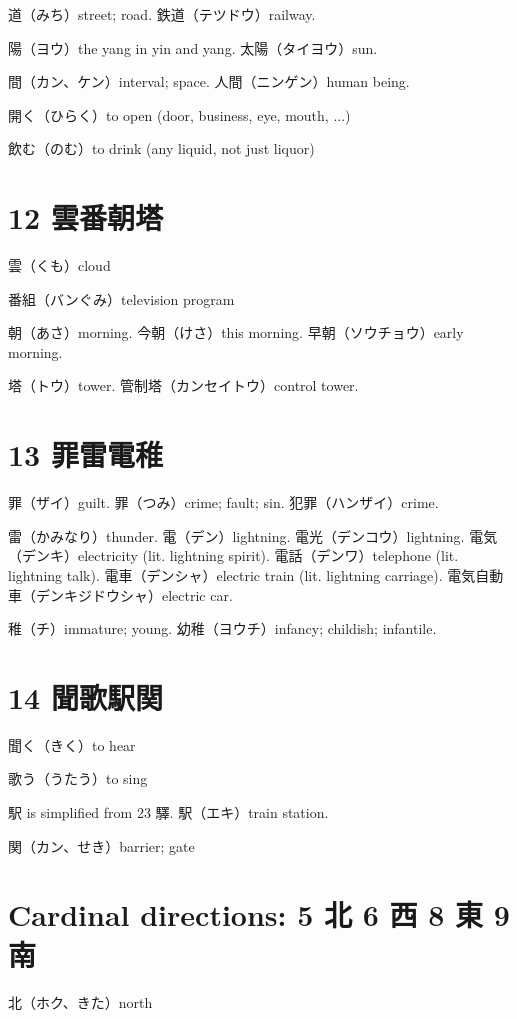 道（みち）street; road.
鉄道（テツドウ）railway.

陽（ヨウ）the yang in yin and yang.
太陽（タイヨウ）sun.

間（カン、ケン）interval; space.
人間（ニンゲン）human being.

開く（ひらく）to open (door, business, eye, mouth, ...)

飲む（のむ）to drink (any liquid, not just liquor)

\section{12 雲番朝塔}

雲（くも）cloud

番組（バンぐみ）television program

朝（あさ）morning.
今朝（けさ）this morning.
早朝（ソウチョウ）early morning.

塔（トウ）tower.
管制塔（カンセイトウ）control tower.

\section{13 罪雷電稚}

罪（ザイ）guilt.
罪（つみ）crime; fault; sin.
犯罪（ハンザイ）crime.

雷（かみなり）thunder.
電（デン）lightning.
電光（デンコウ）lightning.
電気（デンキ）electricity (lit. lightning spirit).
電話（デンワ）telephone (lit. lightning talk).
電車（デンシャ）electric train (lit. lightning carriage).
電気自動車（デンキジドウシャ）electric car.

稚（チ）immature; young.
幼稚（ヨウチ）infancy; childish; infantile.

\section{14 聞歌駅関}

聞く（きく）to hear

歌う（うたう）to sing

駅 is simplified from 23 驛.
駅（エキ）train station.

関（カン、せき）barrier; gate

\section{Cardinal directions: 5 北 6 西 8 東 9 南}

北（ホク、きた）north

